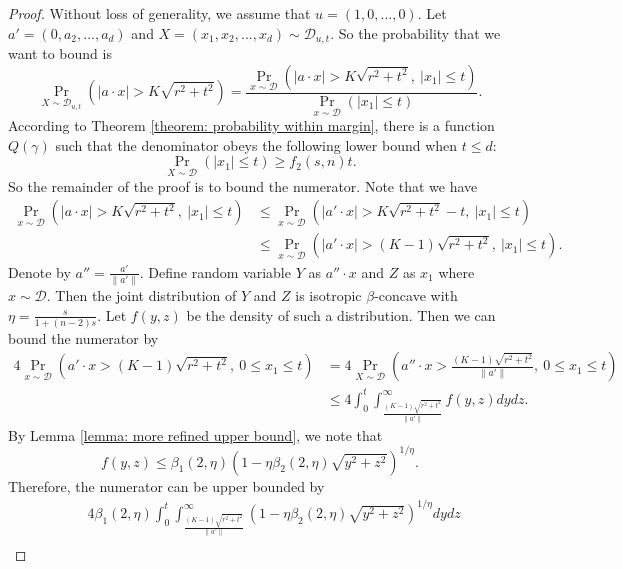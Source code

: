 \documentclass[11pt]{article}
\newcommand{\cD}{\mathcal{D}}
\begin{document}
{{{{\medskip
\begin{proof}
Without loss of generality, we assume that $u=(1,0,...,0)$. Let $a'=(0,a_2,...,a_d)$ and $X=(x_1,x_2,...,x_d)\sim \cD_{u,t}$. So the probability that we want to bound is
\begin{equation*}
\Pr_{X\sim \cD_{u,t}}(|a\cdot x|> K\sqrt{r^2+t^2})=\frac{\Pr_{x\sim \cD}(|a\cdot x|> K\sqrt{r^2+t^2},\ |x_1|\le t)}{\Pr_{x\sim \cD}(|x_1|\le t)}.
\end{equation*}
According to Theorem \ref{theorem: probability within margin}, there is a function $Q(\gamma)$ such that the denominator obeys the following lower bound when $t\le d$:
\begin{equation*}
\Pr_{X\sim \cD}(|x_1|\le t)\ge f_2(s,n)t.
\end{equation*}
So the remainder of the proof is to bound the numerator. Note that we have
\begin{equation*}
\begin{split}
\Pr_{x\sim \cD}(|a\cdot x|> K\sqrt{r^2+t^2},\ |x_1|\le t)&\le \Pr_{x\sim \cD}(|a'\cdot x|> K\sqrt{r^2+t^2}-t,\ |x_1|\le t)\\
&\le \Pr_{x\sim \cD}(|a'\cdot x|> (K-1)\sqrt{r^2+t^2},\ |x_1|\le t).
\end{split}
\end{equation*}
Denote by $a''=\frac{a'}{\|a'\|}$. Define random variable $Y$ as $a''\cdot x$ and $Z$ as $x_1$ where $x\sim\cD$. Then the joint distribution of $Y$ and $Z$ is isotropic $\beta$-concave with $\eta=\frac{s}{1+(n-2)s}$. Let $f(y,z)$ be the density of such a distribution. Then we can bound the numerator by
\begin{equation*}
\begin{split}
4\Pr_{x\sim \cD}(a'\cdot x>(K-1)\sqrt{r^2+t^2},\ 0\le x_1\le t)&=4\Pr_{X\sim \cD}(a''\cdot x>\frac{(K-1)\sqrt{r^2+t^2}}{\|a'\|},\ 0\le x_1\le t)\\
&\le 4\int_0^t\int_{\frac{(K-1)\sqrt{r^2+t^2}}{\|a'\|}}^\infty f(y,z) dydz.
\end{split}
\end{equation*}
By Lemma \ref{lemma: more refined upper bound}, we note that
\begin{equation*}
f(y,z)\le \beta_1(2,\eta)(1-\eta\beta_2(2,\eta)\sqrt{y^2+z^2})^{1/\eta}.
\end{equation*}
Therefore, the numerator can be upper bounded by
\begin{equation}
\begin{split}
&\quad \ 4\beta_1(2,\eta)\int_0^t\int_{\frac{(K-1)\sqrt{r^2+t^2}}{\|a'\|}}^\infty (1-\eta\beta_2(2,\eta)\sqrt{y^2+z^2})^{1/\eta} dydz\\

\end{split}
\end{equation}
\end{proof}}}}}
\end{document}
